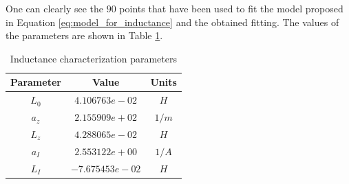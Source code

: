 One can clearly see the $90$ points that have been used to fit the model proposed in Equation \ref{eq:model_for_inductance} and the obtained fitting.
The values of the parameters are shown in Table \ref{tab:inductance_characterization_parameters}.

\begin{table}[H]
    \centering
    \begin{tabular}{|c|c|c|}
        \hline
        \textbf{Parameter} & \textbf{Value}  & \textbf{Units} \\
        \hline
        $L_0$              & $4.106763e-02$  & $H$            \\
        $a_z$              & $2.155909e+02$  & $1/m$          \\
        $L_z$              & $4.288065e-02$  & $H$            \\
        $a_I$              & $2.553122e+00$  & $1/A$          \\
        $L_I$              & $-7.675453e-02$ & $H$            \\
        \hline
    \end{tabular}

    \caption{Inductance characterization parameters}
    \label{tab:inductance_characterization_parameters}

\end{table}
